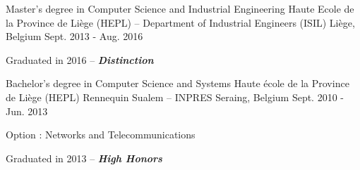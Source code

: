 
\begin{cventries}

  \cventry
    {Master's degree in Computer Science and Industrial Engineering} %
    {Haute Ecole de la Province de Liège (HEPL) -- Department of Industrial Engineers (ISIL)} %
    {Liège, Belgium} %
    {Sept. 2013 - Aug. 2016} %
    {
      \begin{cvitems} %
        \item{Graduated in 2016 -- \textbf{\textit{Distinction}}}
      \end{cvitems}
    }

  \cventry
    {Bachelor's degree in Computer Science and Systems} %
    {Haute école de la Province de Liège (HEPL) Rennequin Sualem -- INPRES} %
    {Seraing, Belgium} %
    {Sept. 2010 - Jun. 2013} %
    {
      \begin{cvitems} %
        \item{Option : Networks and Telecommunications}
        \item{Graduated in 2013 -- \textbf{\textit{High Honors}}}
      \end{cvitems}
    }


\end{cventries}


